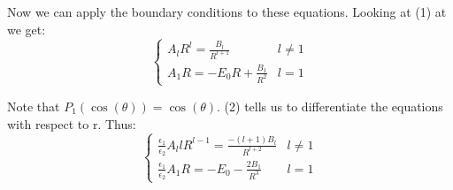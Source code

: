 \documentclass[a4paper, 11pt]{article}
\begin{document}
Now we can apply the boundary conditions to these equations. Looking at (1) at we get: 
	\begin{equation*}
	\begin{cases}
		A_lR^l = \frac{B_l}{R^{l+1}} & l\neq 1 \\
		A_1R = -E_0R + \frac{B_1}{R^2} & l = 1 
	\end{cases}
	\end{equation*}
	
Note that $P_1(\cos(\theta))= \cos(\theta)$. (2) tells us to differentiate the equations with respect to r. Thus: 
	\begin{equation*}
	\begin{cases}
		\frac{\epsilon_1}{\epsilon_2}A_llR^{l-1} = \frac{-(l+1)B_l}{R^{l+2}} & l\neq 1 \\ 
		\frac{\epsilon_1}{\epsilon_2}A_1R = -E_0-\frac{2B_1}{R^3} & l=1
	\end{cases}
	\end{equation*}
\end{document}
